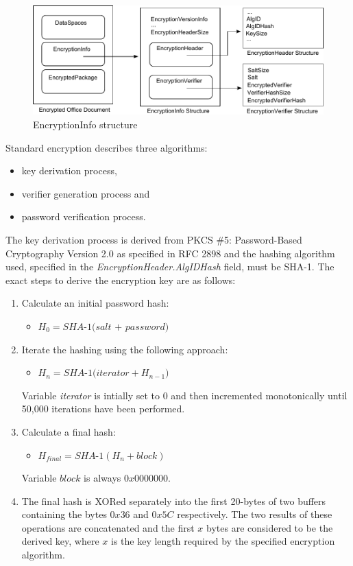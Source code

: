 \documentclass[11pt,oneside]{fithesis2}
\begin{document}
\begin{figure}[ht]
	\centering
	\includegraphics[width=1\textwidth]{figures/ei_struct.pdf}
	\caption{EncryptionInfo structure}
	\label{keys_length}
\end{figure}

Standard encryption describes three algorithms:
\begin{itemize}
	\setlength\itemsep{0.1em}
	\item{key derivation process,}
	\item{verifier generation process and}
	\item{password verification process.}
\end{itemize}

The key derivation process is derived from PKCS \#5: Password-Based Cryptography Version 2.0 as specified in RFC 2898 \cite{rfc2898} and the hashing algorithm used, specified in the \textit{EncryptionHeader.AlgIDHash} field, must be SHA-1. The exact steps to derive the encryption key are as follows:

\begin{enumerate}
\item{Calculate an initial password hash:}
	\begin{itemize}
		\item{$H_0 =\textit{SHA-1(salt + password)}$}
	\end{itemize}
\item{Iterate the hashing using the following approach: 
	\begin{itemize}
		\item{$H_n = \textit{SHA-1(iterator} + H_{n-1})$}
	\end{itemize}
	Variable \textit{iterator} is intially set to 0 and then incremented monotonically until 50,000 iterations have been performed.}
\item{Calculate a final hash:
	\begin{itemize}
		\item{$H_{final} = \textit{SHA-1}(H_n + block)$}
	\end{itemize}
	Variable $block$ is always $0x0000000$.}
\item{The final hash is XORed separately into the first 20-bytes of two buffers containing the bytes $0x36$ and $0x5C$ respectively. The two results of these operations are concatenated and the first $x$ bytes are considered to be the derived key, where $x$ is the key length required by the specified encryption algorithm.}
\end{enumerate}
\end{document}
